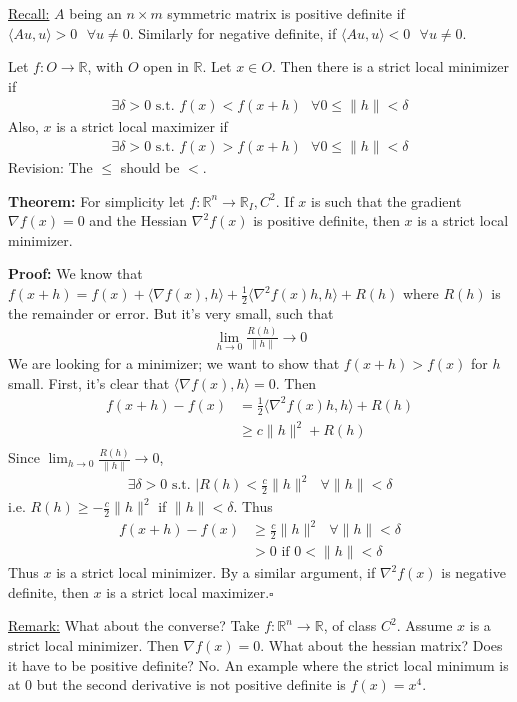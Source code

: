 \documentclass{article}
\newcommand*{\qed}{\hfill$\square$}%
\newcommand*{\txt}[1]{\text{ #1 }}%
\newcommand*{\iprod}[1]{\langle #1 \rangle}
\newcommand*{\fora}{\txt{}\forall}%
\newcommand*{\rr}{\mathbb{R}}%
\begin{document}
\underline{Recall:} $A$ being an $n\times m$ symmetric matrix is positive definite if $\iprod{Au,u}>0\fora u\neq 0$. Similarly for negative definite, if $\iprod{Au,u}<0\fora u\neq 0$.

Let $f:O \to \rr$, with $O$ open in $\rr$. Let $x\in O$. Then there is a strict local minimizer if \begin{align*}
    \exists \delta>0\txt{s.t.}f(x)< f(x+h)\fora 0\leq \|h\|<\delta
\end{align*} Also, $x$ is a strict local maximizer if \begin{align*}
    \exists \delta>0\txt{s.t.}f(x)> f(x+h)\fora 0\leq \|h\|<\delta
\end{align*} Revision: The $\leq$ should be $<$.

\textbf{Theorem:} For simplicity let $f:\rr^n\to \rr_I, C^2$. If $x$ is such that the gradient $\nabla f(x)=0$ and the Hessian $\nabla^2 f(x)$ is positive definite, then $x$ is a strict local minimizer.

\textbf{Proof:} We know that $f(x+h)=f(x)+\iprod{\nabla f(x),h}+\frac{1}{2}\iprod{\nabla^2 f(x)h,h}+R(h)$ where $R(h)$ is the remainder or error. But it's very small, such that \begin{align*}
    \lim_{h\to 0}\frac{R(h)}{\|h\|}\to 0
\end{align*} We are looking for a minimizer; we want to show that $f(x+h)>f(x)$ for $h$ small. First, it's clear that $\iprod{\nabla f(x),h}=0$. Then \begin{align*}
    f(x+h)-f(x)&=\frac{1}{2}\iprod{\nabla^2 f(x)h,h}+R(h)\\
    &\geq c\|h\|^2+R(h)\\
\end{align*} Since $\lim_{h\to 0}\frac{R(h)}{\|h\|}\to 0$, \begin{align*}
    \exists \delta>0\txt{s.t.}|R(h)<\frac{c}{2}\|h\|^2\fora \|h\|<\delta
\end{align*} i.e. $R(h)\geq -\frac{c}{2}\|h\|^2$ if $\|h\|<\delta$. Thus \begin{align*}
    f(x+h)-f(x)&\geq \frac{c}{2}\|h\|^2\fora \|h\|<\delta\\
    &>0\txt{if}0<\|h\|<\delta
\end{align*}Thus $x$ is a strict local minimizer. By a similar argument, if $\nabla^2 f(x)$ is negative definite, then $x$ is a strict local maximizer.\qed 

\underline{Remark:} What about the converse? Take $f:\rr^n\to \rr$, of class $C^2$. Assume $x$ is a strict local minimizer. Then $\nabla f(x)=0$. What about the hessian matrix? Does it have to be positive definite? No. An example where the strict local minimum is at 0 but the second derivative is not positive definite is $f(x)=x^4$.
\end{document}
